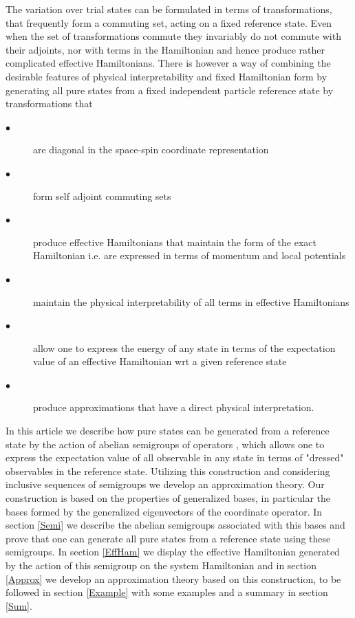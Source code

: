 \documentclass[aps,preprint]{revtex4}%
\begin{document}
The variation over trial states can be formulated in terms of transformations,
that frequently form a commuting set, acting on a fixed reference state. Even
when the set of transformations commute they invariably do not commute with
their adjoints, nor with terms in the Hamiltonian and hence produce rather
complicated effective Hamiltonians. There is however a way of combining the
desirable features of physical interpretability and fixed Hamiltonian form by
generating all pure states from a fixed independent particle reference state
by transformations that

\begin{description}
\item[$\bullet$] are diagonal in the space-spin coordinate representation

\item[$\bullet$] form self adjoint commuting sets

\item[$\bullet$] produce effective Hamiltonians that maintain the form of the
exact Hamiltonian i.e. are expressed in terms of momentum and local potentials

\item[$\bullet$] maintain the physical interpretability of all terms in
effective Hamiltonians

\item[$\bullet$] allow one to express the energy of any state in terms of the
expectation value of an effective Hamiltonian wrt a given reference state

\item[$\bullet$] produce approximations that have a direct physical interpretation.
\end{description}

In this article we describe how pure states can be generated from a reference
state by the action of abelian semigroups of operators \cite{Encyclo}, which
allows one to express the expectation value of all observable in any state in
terms of "dressed" observables in the reference state. Utilizing this
construction and considering inclusive sequences of semigroups we develop an
approximation theory. Our construction is based on the properties of
generalized bases, in particular the bases formed by the generalized
eigenvectors of the coordinate operator. In section \ref{Semi} we describe the
abelian semigroups associated with this bases and prove that one can generate
all pure states from a reference state using these semigroups. In section
\ref{EffHam} we display the effective Hamiltonian generated by the action of
this semigroup on the system Hamiltonian and in section \ref{Approx} we
develop an approximation theory based on this construction, to be followed in
section \ref{Example} with some examples and a summary in section \ref{Sum}.
\end{document}
